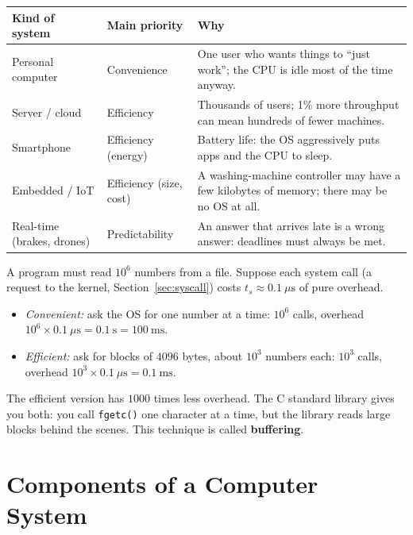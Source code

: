 \documentclass[11pt,a4paper]{article}
\newcommand{\term}[1]{\textbf{\color{mintdeep}#1}}
\newcommand{\cmd}[1]{\texttt{#1}}
\begin{document}
\begin{center}
\renewcommand{\arraystretch}{1.3}
\begin{tabularx}{\linewidth}{>{\raggedright\arraybackslash}p{3.3cm} >{\raggedright\arraybackslash}p{3.2cm} >{\raggedright\arraybackslash}X}
\toprule
\textbf{Kind of system} & \textbf{Main priority} & \textbf{Why} \\
\midrule
Personal computer & Convenience & One user who wants things to ``just work''; the CPU is idle most of the time anyway. \\
Server / cloud & Efficiency & Thousands of users; 1\% more throughput can mean hundreds of fewer machines. \\
Smartphone & Efficiency (energy) & Battery life: the OS aggressively puts apps and the CPU to sleep. \\
Embedded / IoT & Efficiency (size, cost) & A washing-machine controller may have a few kilobytes of memory; there may be no OS at all. \\
Real-time (brakes, drones) & Predictability & An answer that arrives late is a wrong answer: deadlines must always be met. \\
\bottomrule
\end{tabularx}
\end{center}

\begin{example}
A program must read $10^{6}$ numbers from a file. Suppose each system call (a request to the kernel, Section~\ref{sec:syscall}) costs $t_{s} \approx 0.1\ \mu\text{s}$ of pure overhead.
\begin{itemize}
  \item \emph{Convenient:} ask the OS for one number at a time: $10^{6}$ calls, overhead $10^{6} \times 0.1\ \mu\text{s} = 0.1\ \text{s} = 100\ \text{ms}$.
  \item \emph{Efficient:} ask for blocks of $4096$ bytes, about $10^{3}$ numbers each: $10^{3}$ calls, overhead $10^{3} \times 0.1\ \mu\text{s} = 0.1\ \text{ms}$.
\end{itemize}
The efficient version has $1000$ times less overhead. The C standard library gives you both: you call \cmd{fgetc()} one character at a time, but the library reads large blocks behind the scenes. This technique is called \term{buffering}.
\end{example}

\section{Components of a Computer System}
\end{document}
